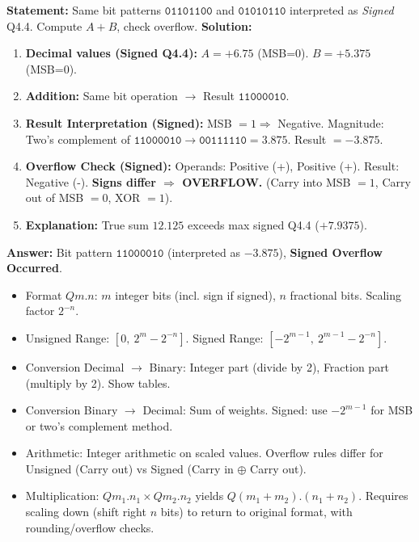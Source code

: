 \documentclass[11pt]{article}
\begin{document}
\begin{exoresolu}
\textbf{Statement:} Same bit patterns $\mathtt{01101100}$ and $\mathtt{01010110}$ interpreted as \emph{Signed} Q4.4. Compute $A+B$, check overflow.
\tcblower
\textbf{Solution:}
\begin{enumerate}
    \item \textbf{Decimal values (Signed Q4.4):}
        $A = +6.75$ (MSB=0). $B = +5.375$ (MSB=0).
    \item \textbf{Addition:} Same bit operation $\to$ Result $\mathtt{11000010}$.
    \item \textbf{Result Interpretation (Signed):} MSB $= 1 \Rightarrow$ Negative.
        Magnitude: Two's complement of $\mathtt{11000010} \to \mathtt{00111110} = 3.875$.
        Result $= -3.875$.
    \item \textbf{Overflow Check (Signed):}
        Operands: Positive (+), Positive (+).
        Result: Negative (-).
        \textbf{Signs differ $\Rightarrow$ OVERFLOW.}
        (Carry into MSB $=1$, Carry out of MSB $=0$, XOR $=1$).
    \item \textbf{Explanation:} True sum $12.125$ exceeds max signed Q4.4 ($+7.9375$).
\end{enumerate}
\textbf{Answer:} Bit pattern $\mathtt{11000010}$ (interpreted as $-3.875$), \textbf{Signed Overflow Occurred}.
\end{exoresolu}

\begin{aretenir}
\begin{itemize}
    \item Format $Qm.n$: $m$ integer bits (incl. sign if signed), $n$ fractional bits. Scaling factor $2^{-n}$.
    \item Unsigned Range: $[0,\ 2^m - 2^{-n}]$. Signed Range: $[-2^{m-1},\ 2^{m-1} - 2^{-n}]$.
    \item Conversion Decimal $\to$ Binary: Integer part (divide by 2), Fraction part (multiply by 2). Show tables.
    \item Conversion Binary $\to$ Decimal: Sum of weights. Signed: use $-2^{m-1}$ for MSB or two's complement method.
    \item Arithmetic: Integer arithmetic on scaled values. Overflow rules differ for Unsigned (Carry out) vs Signed (Carry in $\oplus$ Carry out).
    \item Multiplication: $Qm_1.n_1 \times Qm_2.n_2$ yields $Q(m_1+m_2).(n_1+n_2)$. Requires scaling down (shift right $n$ bits) to return to original format, with rounding/overflow checks.
\end{itemize}
\end{aretenir}
\end{document}
